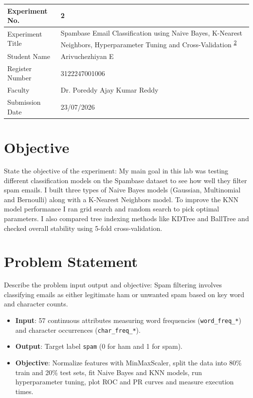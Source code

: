 \documentclass[12pt,a4paper]{article}
\begin{document}
\newpage

\newpage


\begin{tabular}{|p{4cm}|p{11cm}|}
\hline
Experiment No. & 2 \\ \hline
Experiment Title & Spambase Email Classification using Naive Bayes, K-Nearest Neighbors, Hyperparameter Tuning and Cross-Validation \textsuperscript{\href{https://github.com/arivuchezhiyan/Machine_Learning/tree/main/experiment_2}{2}} \\ \hline
Student Name & Arivuchezhiyan E \\ \hline
Register Number & 3122247001006 \\ \hline
Faculty & Dr. Poreddy Ajay Kumar Reddy \\ \hline
Submission Date & 23/07/2026 \\ \hline
\end{tabular}

\section{Objective}
State the objective of the experiment:
My main goal in this lab was testing different classification models on the Spambase dataset to see how well they filter spam emails. I built three types of Naive Bayes models (Gaussian, Multinomial and Bernoulli) along with a K-Nearest Neighbors model. To improve the KNN model performance I ran grid search and random search to pick optimal parameters. I also compared tree indexing methods like KDTree and BallTree and checked overall stability using 5-fold cross-validation.

\section{Problem Statement}
Describe the problem input output and objective:
Spam filtering involves classifying emails as either legitimate ham or unwanted spam based on key word and character counts.
\begin{itemize}
\item \textbf{Input}: 57 continuous attributes measuring word frequencies (\texttt{word\_freq\_*}) and character occurrences (\texttt{char\_freq\_*}).
\item \textbf{Output}: Target label \texttt{spam} (0 for ham and 1 for spam).
\item \textbf{Objective}: Normalize features with MinMaxScaler, split the data into 80\% train and 20\% test sets, fit Naive Bayes and KNN models, run hyperparameter tuning, plot ROC and PR curves and measure execution times.
\end{itemize}
\end{document}

